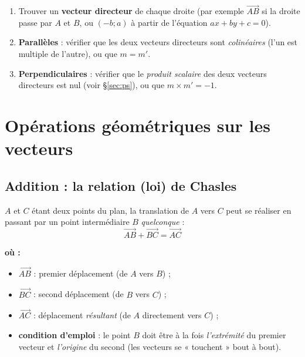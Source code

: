 \documentclass[11pt,a4paper]{article}
\newenvironment{ou}{%
  \par\smallskip\noindent\textbf{où :}\nopagebreak
  \begin{itemize}[leftmargin=1.8em,topsep=2pt,itemsep=1.5pt,parsep=0pt]}%
  {\end{itemize}}
\newcommand{\vc}[1]{\overrightarrow{#1}}        %
\begin{document}
\begin{methode}
\begin{enumerate}[leftmargin=1.8em,topsep=2pt,itemsep=2pt]
  \item Trouver un \textbf{vecteur directeur} de chaque droite (par exemple $\vc{AB}$ si la droite passe
        par $A$ et $B$, ou $(-b;a)$ à partir de l'équation $ax+by+c=0$).
  \item \textbf{Parallèles} : vérifier que les deux vecteurs directeurs sont \emph{colinéaires}
        (l'un est multiple de l'autre), ou que $m=m'$.
  \item \textbf{Perpendiculaires} : vérifier que le \emph{produit scalaire} des deux vecteurs directeurs
        est nul (voir §\ref{sec:ps}), ou que $m\times m'=-1$.
\end{enumerate}
\end{methode}

\section{Opérations géométriques sur les vecteurs}

\subsection{Addition : la relation (loi) de Chasles}

\begin{theoreme}
$A$ et $C$ étant deux points du plan, la translation de $A$ vers $C$ peut se réaliser en passant par un
point intermédiaire $B$ \emph{quelconque} :
\[
  \boxed{\;\vc{AB}+\vc{BC}=\vc{AC}\;}
\]
\begin{ou}
  \item $\vc{AB}$ : premier déplacement (de $A$ vers $B$) ;
  \item $\vc{BC}$ : second déplacement (de $B$ vers $C$) ;
  \item $\vc{AC}$ : déplacement \emph{résultant} (de $A$ directement vers $C$) ;
  \item \textbf{condition d'emploi} : le point $B$ doit être à la fois \emph{l'extrémité} du premier
        vecteur et \emph{l'origine} du second (les vecteurs se « touchent » bout à bout).
\end{ou}
\end{theoreme}
\end{document}

